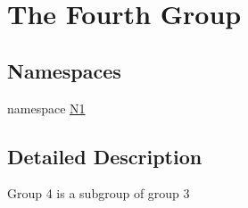 \hypertarget{group__group4}{\section{The Fourth Group}
\label{group__group4}
}
\subsection*{Namespaces}
\begin{DoxyCompactItemize}
\item 
namespace \hyperlink{namespace_n1}{N1}
\end{DoxyCompactItemize}


\subsection{Detailed Description}
Group 4 is a subgroup of group 3 